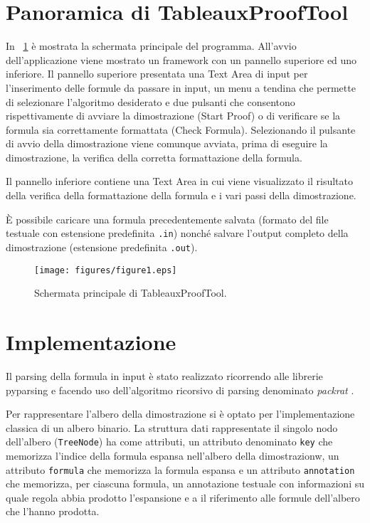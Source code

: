 \documentclass[12pt,a4paper]{article}
\theoremstyle{plain}
\theoremstyle{definition}
\theoremstyle{remark}
\begin{document}
\section*{Panoramica di TableauxProofTool}
In \figurename~\ref{fig:figure1} è mostrata la schermata principale del programma. All'avvio dell'applicazione viene mostrato un
framework con un pannello superiore ed uno inferiore. Il pannello superiore presentata una Text Area di input per l'inserimento
delle formule da passare in input, un menu a tendina che permette di selezionare l'algoritmo desiderato e due pulsanti
che consentono rispettivamente di avviare la dimostrazione (Start Proof) o di verificare se la formula sia correttamente 
formattata (Check Formula). Selezionando il pulsante di avvio della dimostrazione viene comunque avviata, prima di eseguire
la dimostrazione, la verifica della corretta formattazione della formula.

Il pannello inferiore contiene una Text Area in cui viene visualizzato il risultato della verifica della formattazione della
formula e i vari passi della dimostrazione.

È possibile caricare una formula precedentemente salvata (formato del file testuale con estensione predefinita 
\texttt{.in}) nonché salvare l'output completo della dimostrazione (estensione predefinita \texttt{.out}).

\begin{figure}[H]
\centering
\linespread{1.0}
\texttt{[image: figures/figure1.eps]}
\caption[Schermata principale di Graphtool]{Schermata principale di TableauxProofTool.}
\label{fig:figure1}
\end{figure}

\section*{Implementazione}
Il parsing della formula in input è stato realizzato ricorrendo alle librerie pyparsing \cite{mcguire2007getting} e facendo uso
dell'algoritmo ricorsivo di parsing denominato \emph{packrat} \cite{pyparsingfaq}.

Per rappresentare l'albero della dimostrazione si è optato per l'implementazione classica di un 
albero binario. La struttura dati rappresentate il singolo nodo dell'albero (\texttt{TreeNode}) ha come attributi, un attributo 
denominato \texttt{key}
che memorizza l'indice della formula espansa nell'albero della dimostrazionw, un attributo \texttt{formula} che memorizza la formula espansa
e un attributo \texttt{annotation} che memorizza, per ciascuna formula, un annotazione testuale con informazioni su quale regola
abbia prodotto l'espansione e a il riferimento alle formule dell'albero che l'hanno prodotta.
\end{document}
